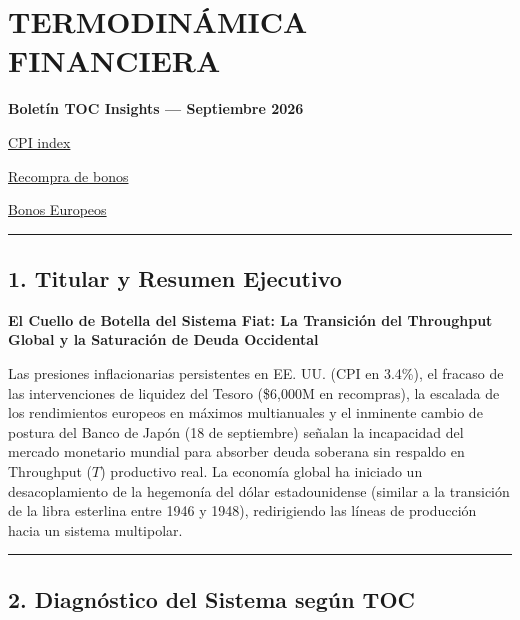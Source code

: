 \documentclass[12pt,letterpaper]{article}
\begin{document}
\hypertarget{termodinuxe1mica-financiera}{%
\section{TERMODINÁMICA FINANCIERA}\label{termodinuxe1mica-financiera}}

\textbf{Boletín TOC Insights --- Septiembre 2026}

\href{https://www.cnbc.com/2026/09/11/cpi-inflation-report-august-2026.html}{CPI
index}

\href{https://www.reuters.com/world/us-treasury-buy-up-6-billion-sept-10-buyback-operation-2026-09-09/}{Recompra
de bonos}

\href{https://www.euronews.com/business/2026/09/11/european-bond-yields-hit-multi-year-highs-as-global-sell-off-continues}{Bonos
Europeos}

\begin{center}\rule{0.5\linewidth}{0.5pt}\end{center}

\hypertarget{titular-y-resumen-ejecutivo}{%
\subsection{1. Titular y Resumen
Ejecutivo}\label{titular-y-resumen-ejecutivo}}

\textbf{El Cuello de Botella del Sistema Fiat: La Transición del
Throughput Global y la Saturación de Deuda Occidental}

Las presiones inflacionarias persistentes en EE. UU. (CPI en 3.4\%), el
fracaso de las intervenciones de liquidez del Tesoro (\$6,000M en
recompras), la escalada de los rendimientos europeos en máximos
multianuales y el inminente cambio de postura del Banco de Japón (18 de
septiembre) señalan la incapacidad del mercado monetario mundial para
absorber deuda soberana sin respaldo en Throughput (\(T\)) productivo
real. La economía global ha iniciado un desacoplamiento de la hegemonía
del dólar estadounidense (similar a la transición de la libra esterlina
entre 1946 y 1948), redirigiendo las líneas de producción hacia un
sistema multipolar.

\begin{center}\rule{0.5\linewidth}{0.5pt}\end{center}

\hypertarget{diagnuxf3stico-del-sistema-seguxfan-toc}{%
\subsection{2. Diagnóstico del Sistema según
TOC}\label{diagnuxf3stico-del-sistema-seguxfan-toc}}
\end{document}
